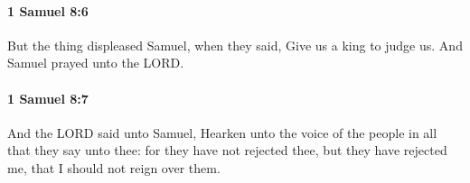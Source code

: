 		\paragraph{1 Samuel 8:6} %
			\label{1SAMUEL-8-6}

			But the thing displeased Samuel, when they said, Give us a king to judge us. And Samuel prayed unto the LORD.


		\paragraph{1 Samuel 8:7} %
			\label{1SAMUEL-8-7}

			And the LORD said unto Samuel, Hearken unto the voice of the people in all that they say unto thee: for they have not rejected thee, but they have rejected me, that I should not reign over them.



